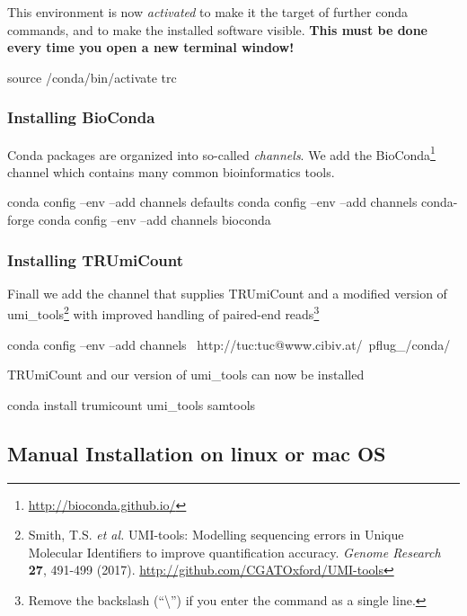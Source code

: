 \documentclass[10pt]{article}
\newenvironment{shellcode}%
   {\bgroup\topsep=0pt\partopsep=0pt\shaded\verbatim}%
   {\endverbatim\endshaded\egroup}
\begin{document}
This environment is now \emph{activated} to make it the target of further conda commands, and to make the installed software visible. \textbf{This must be done every time you open a new terminal window!}

\begin{shellcode}
source /conda/bin/activate trc
\end{shellcode}
\subsubsection*{Installing BioConda}

Conda packages are organized into so-called \emph{channels}. We add the BioConda\footnote{\url{http://bioconda.github.io/}} channel which contains many common bioinformatics tools.

\begin{shellcode}
conda config --env --add channels defaults
conda config --env --add channels conda-forge
conda config --env --add channels bioconda
\end{shellcode}

\subsubsection*{Installing TRUmiCount}

Finall we add the channel that supplies TRUmiCount and a modified version of umi\_tools\footnote{Smith, T.S. \textit{et al.} UMI-tools: Modelling sequencing errors in Unique Molecular Identifiers to improve quantification accuracy. \textit{Genome Research} \textbf{27}, 491-499 (2017). \url{http://github.com/CGATOxford/UMI-tools}} with improved handling of paired-end reads\footnote{Remove the backslash (``\textbackslash'') if you enter the command as a single line.}

\begin{shellcode}
conda config --env --add channels \
  http://tuc:tuc@www.cibiv.at/~pflug_/conda/
\end{shellcode}

TRUmiCount and our version of umi\_tools can now be installed

\begin{shellcode}
conda install trumicount umi_tools samtools
\end{shellcode}

\pagebreak
\subsection{Manual Installation on linux or mac OS}
\end{document}
